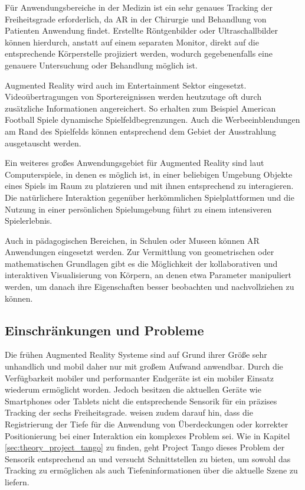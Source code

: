 Für Anwendungsbereiche in der Medizin ist ein sehr genaues Tracking der Freiheitsgrade erforderlich, da AR in der Chirurgie und Behandlung von Patienten Anwendung findet. Erstellte Röntgenbilder oder Ultraschallbilder können hierdurch, anstatt auf einem separaten Monitor, direkt auf die entsprechende Körperstelle projiziert werden, wodurch gegebenenfalls eine genauere Untersuchung oder Behandlung möglich ist. \citep{van2010survey} 

Augmented Reality wird auch im Entertainment Sektor eingesetzt. Videoübertragungen von Sportereignissen werden heutzutage oft durch zusätzliche Informationen angereichert. So erhalten zum Beispiel American Football Spiele dynamische Spielfeldbegrenzungen. Auch die Werbeeinblendungen am Rand des Spielfelds können entsprechend dem Gebiet der Ausstrahlung ausgetauscht werden. \citep{azuma2001recent} 

Ein weiteres großes Anwendungsgebiet für Augmented Reality sind laut \citet{azuma2001recent} Computerspiele, in denen es möglich ist, in einer beliebigen Umgebung Objekte eines Spiels im Raum zu platzieren und mit ihnen entsprechend zu interagieren. Die natürlichere Interaktion gegenüber herkömmlichen Spielplattformen und die Nutzung in einer persönlichen Spielumgebung führt zu einem intensiveren Spielerlebnis. 

Auch in pädagogischen Bereichen, in Schulen oder Museen können AR Anwendungen eingesetzt werden. Zur Vermittlung von geometrischen oder mathematischen Grundlagen gibt es die Möglichkeit der kollaborativen und interaktiven Visualisierung von Körpern, an denen etwa Parameter manipuliert werden, um danach ihre Eigenschaften besser beobachten und nachvollziehen zu können. \citep{van2010survey} 

\subsection{Einschränkungen und Probleme}

Die frühen Augmented Reality Systeme sind auf Grund ihrer Größe sehr unhandlich und mobil daher nur mit großem Aufwand anwendbar. Durch die Verfügbarkeit mobiler und performanter Endgeräte ist ein mobiler Einsatz wiederum ermöglicht worden. Jedoch besitzen die aktuellen Geräte wie Smartphones oder Tablets nicht die entsprechende Sensorik für ein präzises Tracking der sechs Freiheitsgrade. \citet{van2010survey} weisen zudem darauf hin, dass die Registrierung der Tiefe für die Anwendung von Überdeckungen oder korrekter Positionierung bei einer Interaktion ein komplexes Problem sei. Wie in Kapitel \ref{sec:theory_project_tango} zu finden, geht Project Tango dieses Problem der Sensorik entsprechend an und versucht Schnittstellen zu bieten, um sowohl das Tracking zu ermöglichen als auch Tiefeninformationen über die aktuelle Szene zu liefern. 

